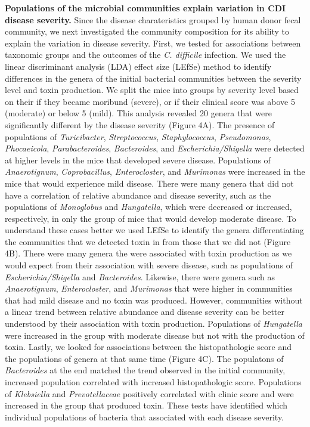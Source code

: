 \documentclass[
  12pt,
]{article}
\begin{document}
\textbf{Populations of the microbial communities explain variation in
CDI disease severity.} Since the disease charateristics grouped by human
donor fecal community, we next investigated the community composition
for its ability to explain the variation in disease severity. First, we
tested for associations between taxonomic groups and the outcomes of the
\emph{C. difficile} infection. We used the linear discriminant analysis
(LDA) effect size (LEfSe) method to identify differences in the genera
of the initial bacterial communities between the severity level and
toxin production. We split the mice into groups by severity level based
on their if they became moribund (severe), or if their clinical score
was above 5 (moderate) or below 5 (mild). This analysis revealed 20
genera that were significantly different by the disease severity (Figure
4A). The presence of populations of \emph{Turicibacter},
\emph{Streptococcus}, \emph{Staphylococcus}, \emph{Pseudomonas},
\emph{Phocaeicola}, \emph{Parabacteroides}, \emph{Bacteroides}, and
\emph{Escherichia/Shigella} were detected at higher levels in the mice
that developed severe disease. Populations of \emph{Anaerotignum},
\emph{Coprobacillus}, \emph{Enterocloster}, and \emph{Murimonas} were
increased in the mice that would experience mild disease. There were
many genera that did not have a correlation of relative abundance and
disease severity, such as the populations of \emph{Monoglobus} and
\emph{Hungatella}, which were decreased or increased, respectively, in
only the group of mice that would develop moderate disease. To
understand these cases better we used LEfSe to identify the genera
differentiating the communities that we detected toxin in from those
that we did not (Figure 4B). There were many genera the were associated
with toxin production as we would expect from their association with
severe disease, such as populations of \emph{Escherichia/Shigella} and
\emph{Bacteroides}. Likewise, there were genera such as
\emph{Anaerotignum}, \emph{Enterocloster}, and \emph{Murimonas} that
were higher in communities that had mild disease and no toxin was
produced. However, communities without a linear trend between relative
abundance and disease severity can be better understood by their
association with toxin production. Populations of \emph{Hungatella} were
increased in the group with moderate disease but not with the production
of toxin. Lastly, we looked for associations between the histopathologic
score and the populations of genera at that same time (Figure 4C). The
populatons of \emph{Bacteroides} at the end matched the trend observed
in the initial community, increased population correlated with increased
histopathologic score. Populations of \emph{Klebsiella} and
\emph{Prevotellaceae} positively correlated with clinic score and were
increased in the group that produced toxin. These tests have identified
which individual populations of bacteria that associated with each
disease severity.
\end{document}
